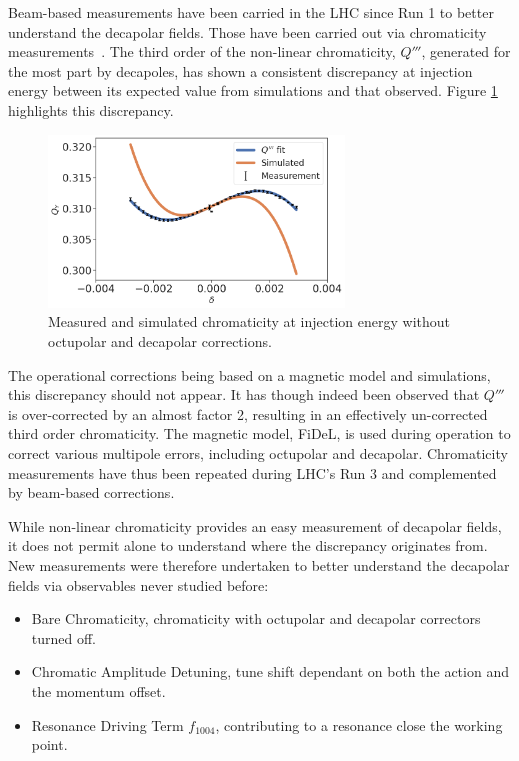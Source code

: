 Beam-based measurements have been carried in the LHC since Run 1 to better understand the decapolar
fields. Those have been carried out via chromaticity
measurements~\cite{maclean_non-linear_2011,maclean_commissioning_2016,maclean_measurement_2014}. 
The third order of the non-linear chromaticity, $Q'''$, generated for the most part by decapoles,
has shown a consistent discrepancy at injection energy between its expected value from simulations
and that observed. Figure \ref{fig:decapoles:bare_chroma_vs_simulations} highlights this
discrepancy.

\begin{figure}[H]
    \centering
    \includegraphics[width=0.7\textwidth]{images/bare_chroma_simulated.png}
    \caption{Measured and simulated chromaticity at injection energy without octupolar and
             decapolar corrections. }
    \label{fig:decapoles:bare_chroma_vs_simulations}
\end{figure}

The operational corrections being based on a magnetic model and simulations, this 
discrepancy should not appear.
It has though indeed been observed that $Q'''$ is over-corrected by an almost factor 2,
resulting in an effectively un-corrected third order chromaticity. The magnetic model, FiDeL, is
used during operation to correct various multipole errors, including octupolar and decapolar.
Chromaticity measurements have thus been repeated during LHC's Run 3 and complemented by beam-based
corrections.

While non-linear chromaticity provides an easy measurement of decapolar fields, it does not permit
alone to understand where the discrepancy originates from. 
New measurements were therefore undertaken to better understand the decapolar fields via observables
never studied before:
\begin{itemize}
    \tightlist
    \item Bare Chromaticity, chromaticity with octupolar and decapolar correctors turned off.
    \item Chromatic Amplitude Detuning, tune shift dependant on both the action and the momentum 
    offset.
    \item Resonance Driving Term $f_{1004}$, contributing to a resonance close the working point.
\end{itemize}



